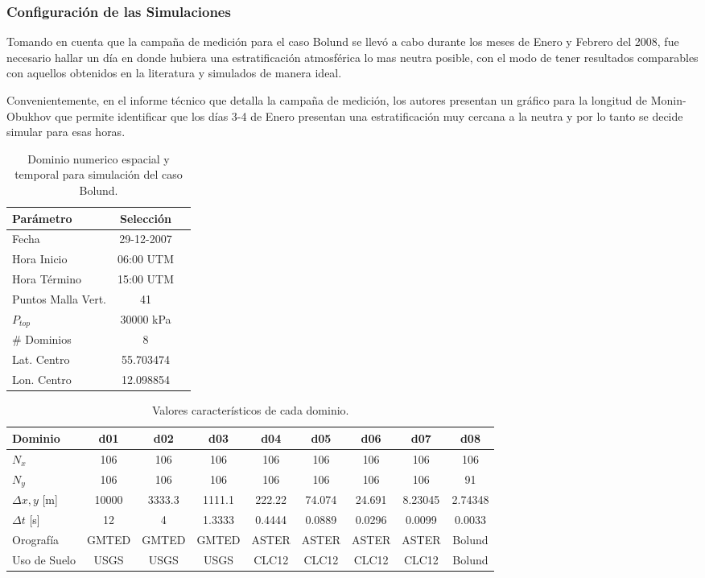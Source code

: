 \subsubsection{Configuración de las Simulaciones}
Tomando en cuenta que la campaña de medición para el caso Bolund se llevó a cabo durante los meses de Enero y Febrero del 2008, fue necesario hallar un día en donde hubiera una estratificación atmosférica lo mas neutra posible, con el modo de tener resultados comparables con aquellos obtenidos en la literatura y simulados de manera ideal.

Convenientemente, en el informe técnico que detalla la campaña de medición, los autores presentan un gráfico para la longitud de Monin-Obukhov que permite identificar que los días 3-4 de Enero presentan una estratificación muy cercana a la neutra y por lo tanto se decide simular para esas horas.
\begin{table}[h!]
	\caption{Dominio numerico espacial y temporal para simulación del caso Bolund.}\label{tab:05_config_bol}
	\centering\footnotesize
	\begin{tabular}{lcc}
		\toprule
		Parámetro & Selección \\
		\midrule
		Fecha	 	 & 29-12-2007   \\
		Hora Inicio	 	 & 06:00 UTM\\
		Hora Término	 		 & 15:00 UTM\\
		Puntos Malla Vert.	 	 & 41   \\
		$P_{top}$ 	& 30000 kPa\\
		\# Dominios	& 8   \\
		Lat. Centro	& 55.703474   \\
		Lon. Centro	& 12.098854   \\
		\bottomrule
	\end{tabular}
\end{table}

\begin{table}[H]
	\caption{Valores característicos de cada dominio.}\label{tab:05_caract_bol}
	\centering\footnotesize
	\begin{tabular}{lcccccccc}
		\toprule
		Dominio 				& d01	&	d02	&	d03	&	d04	&	d05	&	d06 &	d07&	d08 \\
		\midrule
		$N_x$		& 106 & 106 & 106 &106&106&106&106&106  \\
		$N_y$	 		& 106 & 106 & 106 &106&106&106&106&91  \\
		$\Delta x, y$	[m]	 		& 10000 & 3333.3 & 1111.1 &222.22&74.074&24.691&8.23045&2.74348  \\
		$\Delta t$	[s]	 		& 12 & 4 & 1.3333 &0.4444&0.0889&0.0296&0.0099&0.0033  \\
		Orografía		 	& GMTED & GMTED & GMTED &ASTER&ASTER&ASTER&ASTER&Bolund  \\
		Uso de Suelo		& USGS & USGS & USGS &CLC12&CLC12&CLC12&CLC12&Bolund \\
		\bottomrule
	\end{tabular}
\end{table}

